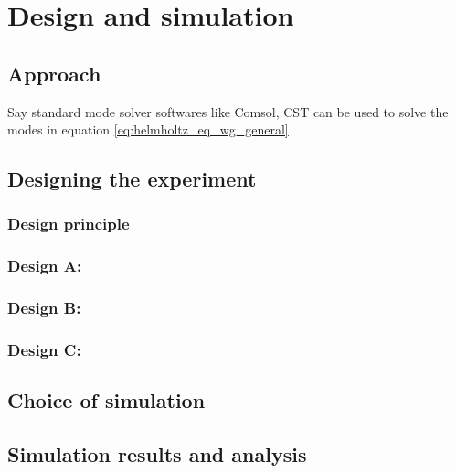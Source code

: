 \documentclass[../report.tex]{subfiles}
\begin{document}
	

\chapter{Design and simulation}
	\section{Approach}
	Say standard mode solver softwares like Comsol, CST can be used to solve the modes in equation \ref{eq:helmholtz_eq_wg_general}
	\section{Designing the experiment}

		\subsection{Design principle}
	
		\subsection{Design A: }
		
		\subsection{Design B: }
		
		\subsection{Design C: }
	
	\section{Choice of simulation}
	
	\section{Simulation results and analysis}
	
\end{document}
